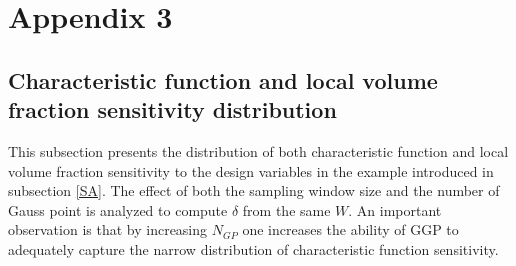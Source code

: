 \chapter{Appendix 3}
\section{Characteristic function and local volume fraction sensitivity distribution}
This subsection presents the distribution of both characteristic function and local volume fraction sensitivity to the design variables in the example introduced in subsection \ref{SA}. The effect of both the sampling window size and the number of Gauss point is analyzed to compute $\delta$ from the same $W$.
An important observation is that by increasing $N_{GP}$ one increases the ability of GGP to adequately capture the narrow distribution of characteristic function sensitivity.
